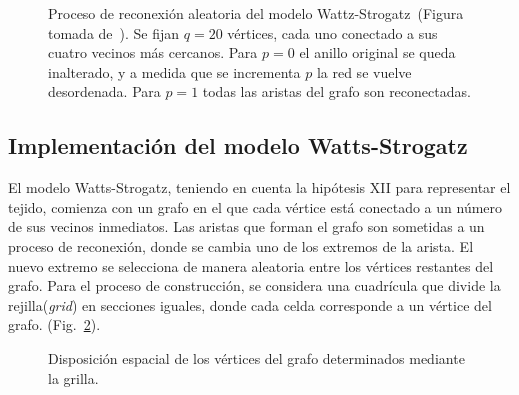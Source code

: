 \begin{figure}[!ht]
\begin{center}
\end{center}\vspace*{-0.6cm}
\caption[Proceso de reconexi\'on aleatoria del modelo Wattz-Strogatz]{Proceso de reconexi\'on aleatoria del modelo Wattz-Strogatz~(Figura tomada de~\cite{complexnetworks}). Se fijan $q = 20$ v\'ertices, cada uno conectado a sus cuatro vecinos m\'as cercanos. Para $p = 0$ el anillo original se queda inalterado, y a medida que se incrementa $p$ la red se vuelve desordenada. Para $p = 1$ todas las aristas del grafo son reconectadas.}
\label{fig-relations}
\end{figure}

\subsection{Implementaci\'on del modelo Watts-Strogatz}
\label{subsec-watts-2}
El modelo Watts-Strogatz, teniendo en cuenta la hipótesis XII para representar el tejido, comienza con un grafo en el que cada vértice está conectado a un número de sus vecinos inmediatos. Las aristas que forman el grafo son sometidas a un proceso de reconexión, donde se cambia uno de los extremos de la arista. El nuevo extremo se selecciona de manera aleatoria entre los vértices restantes del grafo. Para el proceso de construcción, se considera una cuadrícula que divide la rejilla(\textit{grid}) en secciones iguales, donde cada celda corresponde a un vértice del grafo. (Fig.~\ref{fig-grid-3D-initial}).

\begin{figure}[!ht]
\begin{center}
\end{center}\vspace*{-0.6cm}
\caption[Disposici\'on espacial de los v\'ertices del grafo]{Disposici\'on espacial de los v\'ertices del grafo determinados mediante la grilla.}
\label{fig-grid-3D-initial}
\end{figure}

